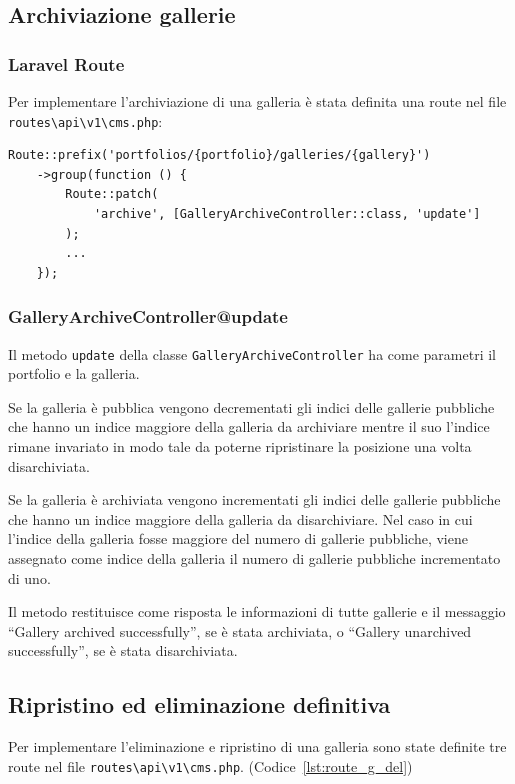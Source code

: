 \subsection{Archiviazione gallerie}
\subsubsection{Laravel Route}
Per implementare l'archiviazione di una galleria \`e stata definita una route nel file \verb|routes\api\v1\cms.php|:
\begin{lstlisting}[caption={Route per l'archiviazione di una galleria}, label={lst:route_g_arch}]
Route::prefix('portfolios/{portfolio}/galleries/{gallery}')
	->group(function () {
		Route::patch(
			'archive', [GalleryArchiveController::class, 'update']
		);
		...
	});
\end{lstlisting}

\subsubsection{GalleryArchiveController@update}
Il metodo \verb|update| della classe \verb|GalleryArchiveController| ha come parametri il portfolio e la galleria.

Se la galleria \`e pubblica vengono decrementati gli indici delle gallerie pubbliche che hanno un indice maggiore della galleria da archiviare mentre il suo l'indice rimane invariato in modo tale da poterne ripristinare la posizione una volta disarchiviata.

Se la galleria \`e archiviata vengono incrementati gli indici delle gallerie pubbliche che hanno un indice maggiore della galleria da disarchiviare. Nel caso in cui l'indice della galleria fosse maggiore del numero di gallerie pubbliche, viene assegnato come indice della galleria il numero di gallerie pubbliche incrementato di uno.

Il metodo restituisce come risposta le informazioni di tutte gallerie e il messaggio ``Gallery archived successfully'', se \`e stata archiviata, o ``Gallery unarchived successfully'', se \`e stata disarchiviata.

\subsection{Ripristino ed eliminazione definitiva}
Per implementare l'eliminazione e ripristino di una galleria sono state definite tre route nel file \verb|routes\api\v1\cms.php|. (Codice~\ref{lst:route_g_del})

